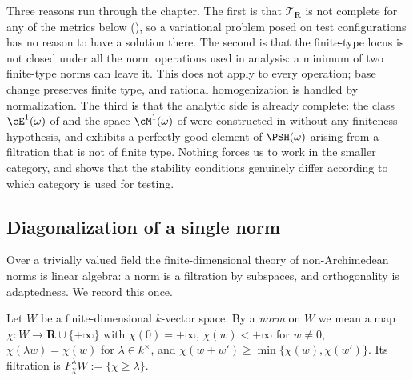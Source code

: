 \begin{remark}
\label{rem:ch50-why-filtrations}
Three reasons run through the chapter.  The first is that
$\mathcal T_{\mathbf R}$ is not complete for any of the metrics below
(), so a variational problem posed on
test configurations has no reason to have a solution there.  The second is
that the finite-type locus is not closed under all the norm operations
used in analysis: a minimum of two finite-type norms can leave it.
This does not apply to every operation; base change preserves finite type,
and rational homogenization is handled by normalization.  The third is
that the analytic side is already complete: the class
$\cE^1(\omega)$ of  and the space $\cM^1(\omega)$ of
 were constructed in
 without any
finiteness hypothesis, and  exhibits a
perfectly good element of $\PSH(\omega)$ arising from a filtration that
is not of finite type.  Nothing forces us to work in the smaller category,
and  shows that the stability conditions genuinely
differ according to which category is used for testing.
\end{remark}

\subsection{Diagonalization of a single norm}
\label{sec:ch50-diagonal}

Over a trivially valued field the finite-dimensional theory of
non-Archimedean norms is linear algebra: a norm is a filtration by
subspaces, and orthogonality is adaptedness.  We record this once.

Let $W$ be a finite-dimensional $k$-vector space.  By a
\emph{norm} on $W$ we mean a map $\chi:W\to\mathbf R\cup\{+\infty\}$
with $\chi(0)=+\infty$, $\chi(w)<+\infty$ for $w\ne0$,
$\chi(\lambda w)=\chi(w)$ for $\lambda\in k^\times$, and
$\chi(w+w')\ge\min\{\chi(w),\chi(w')\}$.  Its filtration is
$F^\lambda_\chi W:=\{\chi\ge\lambda\}$.

